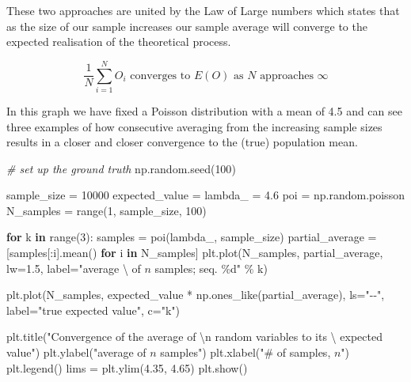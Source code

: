 \documentclass[]{tufte-book}
\newenvironment{Shaded}{}{}
\newcommand{\BuiltInTok}[1]{#1}
\newcommand{\CharTok}[1]{\textcolor[rgb]{0.25,0.44,0.63}{#1}}
\newcommand{\CommentTok}[1]{\textcolor[rgb]{0.38,0.63,0.69}{\textit{#1}}}
\newcommand{\ControlFlowTok}[1]{\textcolor[rgb]{0.00,0.44,0.13}{\textbf{#1}}}
\newcommand{\DecValTok}[1]{\textcolor[rgb]{0.25,0.63,0.44}{#1}}
\newcommand{\FloatTok}[1]{\textcolor[rgb]{0.25,0.63,0.44}{#1}}
\newcommand{\KeywordTok}[1]{\textcolor[rgb]{0.00,0.44,0.13}{\textbf{#1}}}
\newcommand{\NormalTok}[1]{#1}
\newcommand{\OperatorTok}[1]{\textcolor[rgb]{0.40,0.40,0.40}{#1}}
\newcommand{\SpecialCharTok}[1]{\textcolor[rgb]{0.25,0.44,0.63}{#1}}
\newcommand{\StringTok}[1]{\textcolor[rgb]{0.25,0.44,0.63}{#1}}
\theoremstyle{definition}
\theoremstyle{definition}
\theoremstyle{definition}
\theoremstyle{remark}
\begin{document}
These two approaches are united by the Law of Large numbers which states that as the size of our sample increases our sample average will converge to the expected realisation of the theoretical process.

\[  \frac{1}{N} \sum_{i = 1}^{N} O_{i} \text{ converges to }  E(O) \text{ as } N \text{ approaches } \infty \]

In this graph we have fixed a Poisson distribution with a mean of 4.5 and can see three examples of how consecutive averaging from the increasing sample sizes results in a closer and closer convergence to the (true) population mean.

\begin{Shaded}
\begin{Highlighting}[]
\CommentTok{\# set up the ground truth}
\NormalTok{np.random.seed(}\DecValTok{100}\NormalTok{)}

\NormalTok{sample\_size }\OperatorTok{=} \DecValTok{10000}
\NormalTok{expected\_value }\OperatorTok{=}\NormalTok{ lambda\_ }\OperatorTok{=} \FloatTok{4.6}
\NormalTok{poi }\OperatorTok{=}\NormalTok{ np.random.poisson}
\NormalTok{N\_samples }\OperatorTok{=} \BuiltInTok{range}\NormalTok{(}\DecValTok{1}\NormalTok{, sample\_size, }\DecValTok{100}\NormalTok{)}

\ControlFlowTok{for}\NormalTok{ k }\KeywordTok{in} \BuiltInTok{range}\NormalTok{(}\DecValTok{3}\NormalTok{):}
\NormalTok{    samples }\OperatorTok{=}\NormalTok{ poi(lambda\_, sample\_size)}
\NormalTok{    partial\_average }\OperatorTok{=}\NormalTok{ [samples[:i].mean() }\ControlFlowTok{for}\NormalTok{ i }\KeywordTok{in}\NormalTok{ N\_samples]}
\NormalTok{    plt.plot(N\_samples, partial\_average, lw}\OperatorTok{=}\FloatTok{1.5}\NormalTok{, label}\OperatorTok{=}\StringTok{"average \textbackslash{}}
\StringTok{    of  $n$ samples; seq. }\SpecialCharTok{\%d}\StringTok{"} \OperatorTok{\%}\NormalTok{ k)}

\NormalTok{plt.plot(N\_samples, expected\_value }\OperatorTok{*}\NormalTok{ np.ones\_like(partial\_average),}
\NormalTok{         ls}\OperatorTok{=}\StringTok{"{-}{-}"}\NormalTok{, label}\OperatorTok{=}\StringTok{"true expected value"}\NormalTok{, c}\OperatorTok{=}\StringTok{"k"}\NormalTok{)}

\NormalTok{plt.title(}\StringTok{"Convergence of the average of }\CharTok{\textbackslash{}n}\StringTok{ random variables to its \textbackslash{}}
\StringTok{expected value"}\NormalTok{)}
\NormalTok{plt.ylabel(}\StringTok{"average of $n$ samples"}\NormalTok{)}
\NormalTok{plt.xlabel(}\StringTok{"\# of samples, $n$"}\NormalTok{)}
\NormalTok{plt.legend()}
\NormalTok{lims }\OperatorTok{=}\NormalTok{ plt.ylim(}\FloatTok{4.35}\NormalTok{, }\FloatTok{4.65}\NormalTok{)}
\NormalTok{plt.show()}
\end{Highlighting}
\end{Shaded}
\end{document}

